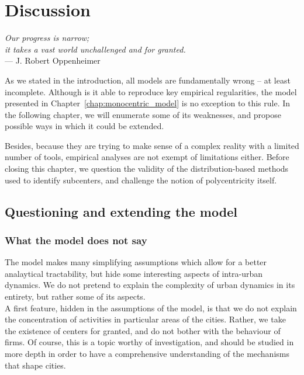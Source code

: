 \chapter{Discussion}
\label{chap:monocentric_discussion}

\begin{flushright}{\slshape    
Our progress is narrow;\\
it takes a vast world unchallenged and for granted.}  \\ \medskip
--- J. Robert Oppenheimer~\cite{Oppenheimer:1954}
\end{flushright}


\bigskip

As we stated in the introduction, all models are fundamentally wrong -- at least
incomplete. Although is it able to reproduce key empirical regularities, the
model presented in Chapter~\ref{chap:monocentric_model} is no exception to this
rule. In the following chapter, we will enumerate some of its weaknesses, and
propose possible ways in which it could be extended.

Besides, because they are trying to make sense of a complex reality with a limited number
of tools, empirical analyses are not exempt of limitations either. Before
closing this chapter, we question the validity of the distribution-based methods used to
identify subcenters, and challenge the notion of polycentricity itself.

\section{Questioning and extending the model}
\label{sec:model}

\subsection{What the model does not say}
\label{sec:what_the_model_does_not_say}

The model makes many simplifying assumptions which allow for a better
analaytical tractability, but hide some interesting aspects of intra-urban
dynamics. We do not pretend to explain the complexity of
urban dynamics in its entirety, but rather some of its aspects.\\ 

A first feature, hidden in the assumptions of the model, is that we do not
explain the concentration of activities in particular areas of the cities.
Rather, we take the existence of centers for granted, and do not bother with the
behaviour of firms. Of course, this is a topic worthy of investigation, and
should be studied in more depth in order to have a comprehensive understanding
of the mechanisms that shape cities.

